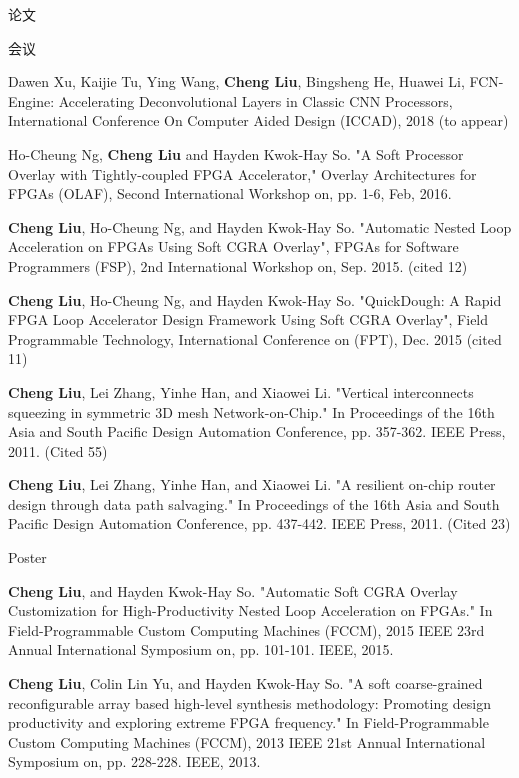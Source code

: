 \documentclass{resume} %
\begin{document}
\begin{rSection}{论文}
    \begin{rSubsection} {会议}{}{}{}
	\item Dawen Xu, Kaijie Tu, Ying Wang, \textbf{Cheng Liu}, Bingsheng He, Huawei Li, FCN-Engine: 
		Accelerating Deconvolutional Layers in Classic CNN Processors, International Conference On 
		Computer Aided Design (ICCAD), 2018 (to appear)
    \item Ho-Cheung Ng, \textbf{Cheng Liu} and Hayden Kwok-Hay So. "A Soft Processor Overlay with
        Tightly-coupled FPGA Accelerator," Overlay Architectures for FPGAs (OLAF), Second
        International Workshop on, pp. 1-6, Feb, 2016. 
    \item \textbf{Cheng Liu}, Ho-Cheung Ng, and Hayden Kwok-Hay So. "Automatic Nested Loop Acceleration on
        FPGAs Using Soft CGRA Overlay", FPGAs for Software Programmers (FSP), 2nd International
        Workshop on, Sep. 2015. (cited 12)
    \item \textbf{Cheng Liu}, Ho-Cheung Ng, and Hayden Kwok-Hay So. "QuickDough: A Rapid FPGA Loop
        Accelerator Design Framework Using Soft CGRA Overlay", Field Programmable Technology,
        International Conference on (FPT), Dec. 2015 (cited 11) 
    \item \textbf{Cheng Liu}, Lei Zhang, Yinhe Han, and Xiaowei Li. "Vertical interconnects squeezing in
        symmetric 3D mesh Network-on-Chip." In Proceedings of the 16th Asia and South Pacific Design
        Automation Conference, pp. 357-362. IEEE Press, 2011. (Cited 55)
    \item \textbf{Cheng Liu}, Lei Zhang, Yinhe Han, and Xiaowei Li. "A resilient on-chip router design
        through data path salvaging." In Proceedings of the 16th Asia and South Pacific Design
        Automation Conference, pp. 437-442. IEEE Press, 2011. (Cited 23)
    \end{rSubsection}

    \begin{rSubsection} {Poster}{}{}{}
    \item \textbf{Cheng Liu}, and Hayden Kwok-Hay So. "Automatic Soft CGRA Overlay Customization for
        High-Productivity Nested Loop Acceleration on FPGAs." In Field-Programmable Custom Computing
        Machines (FCCM), 2015 IEEE 23rd Annual International Symposium on, pp. 101-101. IEEE, 2015.
    \item \textbf{Cheng Liu}, Colin Lin Yu, and Hayden Kwok-Hay So. "A soft coarse-grained reconfigurable
        array based high-level synthesis methodology: Promoting design productivity and exploring
        extreme FPGA frequency." In Field-Programmable Custom Computing Machines (FCCM), 2013 IEEE
        21st Annual International Symposium on, pp. 228-228. IEEE, 2013.
    \end{rSubsection}

\end{rSection}
\end{document}
